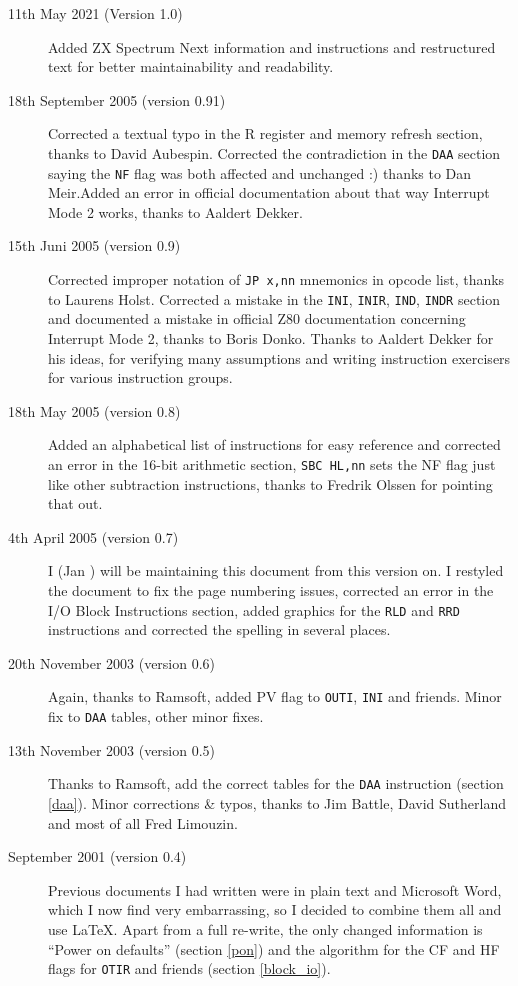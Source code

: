\documentclass[12pt,twoside,openright,a4paper]{book}
\begin{document}
\begin{description}

	\item[11th May 2021 (Version 1.0)]
	Added ZX Spectrum Next information and instructions and restructured text for better maintainability and readability.

	\item[18th September 2005 (version 0.91)]
	Corrected a textual typo in the R register and memory refresh section, thanks to David Aubespin. Corrected the contradiction in the {\tt DAA} section saying the {\tt NF} flag was both affected and unchanged :) thanks to Dan Meir.Added an error in official documentation about that way Interrupt Mode 2 works, thanks to Aaldert Dekker.
	
	\item[15th Juni 2005 (version 0.9)]
	Corrected improper notation of {\tt JP x,nn} mnemonics in opcode list, thanks to Laurens Holst. Corrected a mistake in the {\tt INI}, {\tt INIR}, {\tt IND}, {\tt INDR} section and documented a mistake in official Z80 documentation concerning Interrupt Mode 2, thanks to Boris Donko. Thanks to Aaldert Dekker for his ideas, for verifying many assumptions and writing instruction exercisers for various instruction groups.

	\item[18th May 2005 (version 0.8)]
	Added an alphabetical list of instructions for easy reference and corrected an error in the 16-bit arithmetic section, {\tt SBC HL,nn} sets the NF flag just like other subtraction instructions, thanks to Fredrik Olssen for pointing that out.

	\item[4th April 2005 (version 0.7)]
	I (Jan ) will be maintaining this document from this version on. I restyled the document to fix the page numbering issues, corrected an error in the I/O Block Instructions section, added graphics for the {\tt RLD} and {\tt RRD} instructions and corrected the spelling in several places.

	\item[20th November 2003 (version 0.6)]
	Again, thanks to Ramsoft, added PV flag to {\tt OUTI}, {\tt INI} and friends. Minor fix to {\tt DAA} tables, other minor fixes.

	\item[13th November 2003 (version 0.5)]
	Thanks to Ramsoft, add the correct tables for the {\tt DAA} instruction (section \ref{daa}). Minor corrections \& typos, thanks to Jim Battle, David Sutherland and most of all Fred Limouzin.

	\item[September 2001 (version 0.4)]
	Previous documents I had written were in plain text and Microsoft Word, which I now find very embarrassing, so I decided to combine them all and use {\LaTeX}. Apart from a full re-write, the only changed information is ``Power on defaults'' (section \ref{pon}) and the algorithm for the CF and HF flags for {\tt OTIR} and friends (section \ref{block_io}).

\end{description}
\end{document}
